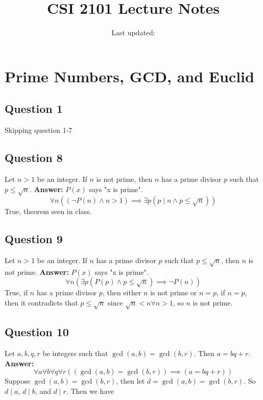 \documentclass[openany]{report}
\title{CSI 2101 Lecture Notes}
\author{Last updated:}
\begin{document}
\maketitle

\tableofcontents

\chapter{}
\chapter{}
\chapter{}
\chapter{Prime Numbers, GCD, and Euclid}
\section{Question 1}
Skipping question 1-7
\setcounter{section}{7}
\section{Question 8}
Let $n > 1$ be an integer. If $n$ is not prime, then $n$ has a prime divisor $p$ such that $p \leq \sqrt{n}$. 
\textbf{Answer:} $P(x)$ says "x is prime".
\[\forall n ( (\neg P(n) \wedge n > 1) \implies \exists p(p \mid n \wedge p \leq \sqrt{n}))\]
True, theorem seen in class. 
\section{Question 9}
Let $n > 1$ be an integer. If $n$ has a prime divisor $p$ such that $p \leq \sqrt{n}$, then $n$ is not prime.
\textbf{Answer:} $P(x)$ says "x is prime".
\[\forall n (\exists p(P(p) \wedge p \leq \sqrt{n}) \implies \neg P(n))\]
True, if $n$ has a prime divisor $p$, then either $n$ is not prime or $n = p$, if $n = p$, then it contradicts that $p \leq \sqrt{n}$ since $\sqrt{n} < n \forall n > 1$, so $n$ is not prime.
\section{Question 10}
Let $a,b,q,r$ be integers such that $\gcd(a,b) = \gcd(b,r)$. Then $a = bq+r$. 
\textbf{Answer:} 
\[\forall a \forall b \forall q \forall r((\gcd(a,b) = \gcd(b,r)) \implies (a = bq +r)) \]
Suppose $\gcd(a,b) = \gcd(b,r)$, then let $d = \gcd(a,b) = \gcd(b,r)$. So $d \mid a$, $d \mid b$, and $d \mid r$. Then we have    
\end{document}
